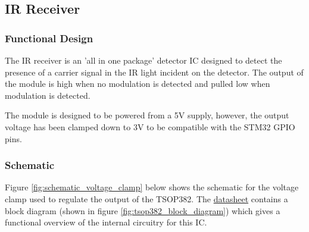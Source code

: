 



\subsection{IR Receiver}

\subsubsection{Functional Design}
The IR receiver is an 'all in one package' detector IC designed to detect the presence of a carrier signal in the IR light incident on the detector. The output of the module is high when no modulation is detected and pulled low when modulation is detected.

The module is designed to be powered from a 5V supply, however, the output voltage has been clamped down to 3V to be compatible with the STM32 GPIO pins.

\subsubsection{Schematic}
Figure \ref{fig:schematic_voltage_clamp} below shows the schematic for the voltage clamp used to regulate the output of the TSOP382. The \href{https://www.vishay.com/docs/82491/tsop382.pdf}{datasheet} contains a block diagram (shown in figure \ref{fig:tsop382_block_diagram}) which gives a functional overview of the internal circuitry for this IC.


